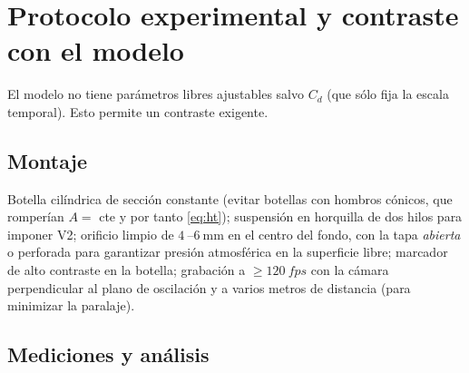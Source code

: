 \documentclass[11pt,a4paper]{article}
\begin{document}
\section{Protocolo experimental y contraste con el modelo}
\label{sec:experimento}

El modelo no tiene parámetros libres ajustables salvo $C_d$ (que sólo fija la escala temporal).
Esto permite un contraste exigente.

\subsection{Montaje}

Botella cilíndrica de sección constante (evitar botellas con hombros cónicos, que romperían
$A=$ cte y por tanto \eqref{eq:ht}); suspensión en horquilla de dos hilos para imponer V2;
orificio limpio de $\SI{4}{}$--$\SI{6}{\milli\meter}$ en el centro del fondo, con la tapa
\emph{abierta} o perforada para garantizar presión atmosférica en la superficie libre; marcador
de alto contraste en la botella; grabación a $\ge\SI{120}{fps}$ con la cámara perpendicular al
plano de oscilación y a varios metros de distancia (para minimizar la paralaje).

\subsection{Mediciones y análisis}
\end{document}
